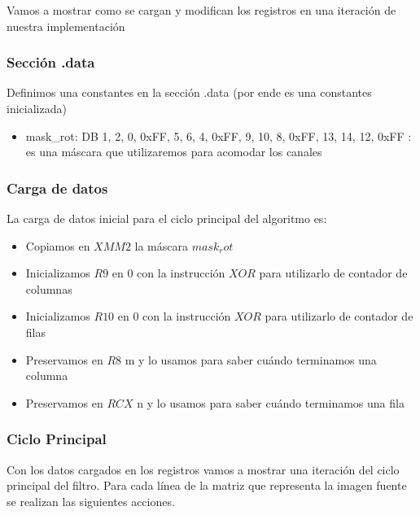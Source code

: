 Vamos a mostrar como se cargan y modifican los registros en una iteración de nuestra implementación

\subsubsection{Sección .data}

\indent Definimos una constantes en la sección .data (por ende es una constantes inicializada) 
\begin{itemize}

\item mask_rot: DB 1, 2, 0, 0xFF, 5, 6, 4, 0xFF, 9, 10, 8, 0xFF, 13, 14, 12, 0xFF : es una máscara que utilizaremos para acomodar los canales

\end{itemize}


\subsubsection{Carga de datos}


\indent La carga de datos inicial para el ciclo principal del algoritmo es:


\begin{itemize}
\item Copiamos en $XMM2$ la m\'ascara $mask_rot$
\item Inicializamos $R9$ en 0 con la instrucción $XOR$ para utilizarlo de contador de columnas
\item Inicializamos $R10$ en 0 con la instrucción $XOR$ para utilizarlo de contador de filas
\item Preservamos en $R8$ m y lo usamos para saber cu\'ando terminamos una columna
\item Preservamos en $RCX$ n y lo usamos para saber cu\'ando terminamos una fila

\end{itemize}

\subsubsection{Ciclo Principal}


\indent Con los datos cargados en los registros vamos a mostrar una iteraci\'on del ciclo principal del filtro. Para cada l\'inea de la matriz que representa la imagen fuente se realizan las siguientes acciones.

